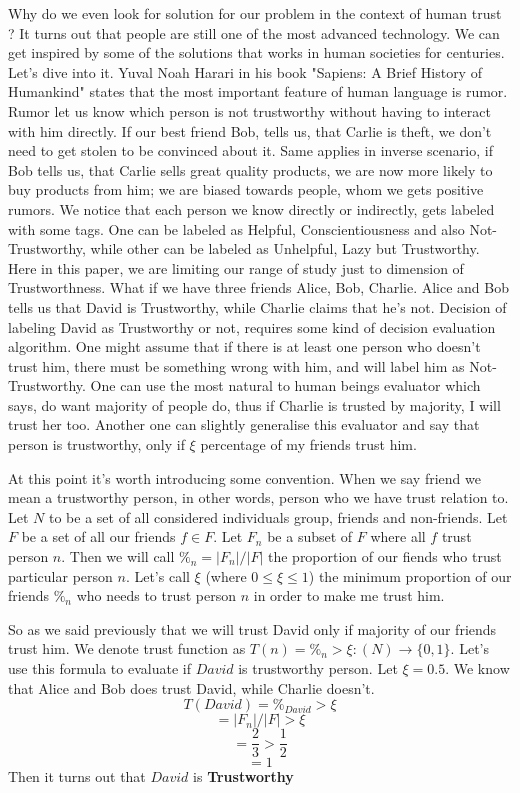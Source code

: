\documentclass[nostrict]{szablonPG}
\begin{document}
Why do we even look for solution for our problem in the context of human trust ? It turns out that people are still one of the most advanced technology. We can get inspired by some of the solutions that works in human societies for centuries. Let's dive into it.
Yuval Noah Harari in his book "Sapiens: A Brief History of Humankind" \cite{harari2014sapiens} states that the most important feature of human language is rumor. Rumor let us know which person is not trustworthy without having to interact with him directly. If our best friend Bob, tells us, that Carlie is theft, we don't need to get stolen to be convinced about it. Same applies in inverse scenario, if Bob tells us, that Carlie sells great quality products, we are now more likely to buy products from him; we are biased towards people, whom we gets positive rumors. We notice that each person we know directly or indirectly, gets labeled with some tags. One can be labeled as Helpful, Conscientiousness and also Not-Trustworthy, while other can be labeled as Unhelpful, Lazy but Trustworthy. Here in this paper, we are limiting our range of study just to dimension of Trustworthness.
What if we have three friends Alice, Bob, Charlie. Alice and  Bob tells us that David is Trustworthy, while Charlie claims that he's not. Decision of labeling David as Trustworthy or not, requires some kind of decision evaluation algorithm.
One might assume that if there is at least one person who doesn't trust him, there must be something wrong with him, and will label him as Not-Trustworthy. One can use the most natural to human beings evaluator which says, do want majority of people do, thus if Charlie is trusted by majority, I will trust her too. Another one can slightly generalise this evaluator and say that person is trustworthy, only if $\xi$ percentage of my friends trust him. 

At this point it's worth introducing some convention. When we say friend we mean a trustworthy person, in other words, person who we have trust relation to. Let $N$ to be a set of all considered individuals group, friends and non-friends. Let $F$ be a set of all our friends $f \in F$. Let $F_n$ be a subset of $F$ where all $f$ trust person $n$. Then we will call $\%_n = |F_n|/|F|$ the proportion of our fiends who trust particular person $n$. Let's call $\xi$ (where $0 \le \xi \leq 1$) the minimum proportion of our friends $\%_n$ who needs to trust person $n$ in order to make me trust him. 

So as we said previously that we will trust David only if majority of our friends trust him. We denote trust function as $T(n) = \%_n > \xi : (N) \rightarrow \{0,1\}$. 
Let's use this formula to evaluate if $David$ is trustworthy person. Let $\xi = 0.5$. We know that Alice and Bob does trust David, while Charlie doesn't.
\[T(David) = \%_{David} > \xi\]
\[= |F_n|/|F| > \xi\]
\[= \frac{2}{3} > \frac{1}{2}\]
\[= 1\]
Then it turns out that $David$ is \textbf{Trustworthy}
\end{document}
